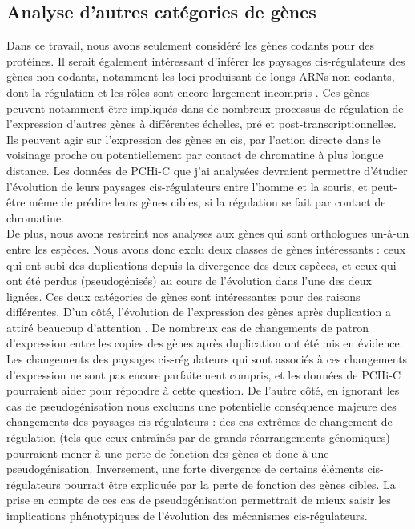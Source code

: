 \subsection{Analyse d’autres catégories de gènes}
Dans ce travail, nous avons seulement considéré les gènes codants pour des protéines. Il serait également intéressant d’inférer les paysages \gls{cis}-régulateurs des gènes non-codants, notamment les loci produisant de longs ARNs non-codants, dont la régulation et les rôles sont encore largement incompris \citep{mercer_long_2009, ransohoff_functions_2018}. Ces gènes peuvent notamment être impliqués dans de nombreux processus de régulation de l’expression d’autres gènes à différentes échelles, pré et post-transcriptionnelles. Ils peuvent agir sur l’expression des gènes en \gls{cis}, par l’action directe dans le voisinage proche ou potentiellement par contact de chromatine à plus longue distance. Les données de \acrshort{PCHi-C} que j’ai analysées devraient permettre d’étudier l'évolution de leurs paysages \gls{cis}-régulateurs entre l’homme et la souris, et peut-être même de prédire leurs gènes cibles, si la régulation se fait par contact de chromatine.\\

De plus, nous avons restreint nos analyses aux gènes qui sont orthologues un-à-un entre les espèces. Nous avons donc exclu deux classes de gènes intéressants : ceux qui ont subi des duplications depuis la divergence des deux espèces, et ceux qui ont été perdus (pseudogénisés) au cours de l’évolution dans l’une des deux lignées. Ces deux catégories de gènes sont intéressantes pour des raisons différentes. D’un côté, l’évolution de l’expression des gènes après duplication a attiré beaucoup d’attention \citep{brunet_gene_2006, guschanski_evolution_2017, carelli_repurposing_2018}. De nombreux cas de changements de patron d’expression entre les copies des gènes après duplication ont été mis en évidence. Les changements des paysages \gls{cis}-régulateurs qui sont associés à ces changements d’expression ne sont pas encore parfaitement compris, et les données de \acrshort{PCHi-C} pourraient aider pour répondre à cette question. De l’autre côté, en ignorant les cas de pseudogénisation nous excluons une potentielle conséquence majeure des changements des paysages \gls{cis}-régulateurs : des cas extrêmes de changement de régulation (tels que ceux entraînés par de grands réarrangements génomiques) pourraient mener à une perte de fonction des gènes et donc à une pseudogénisation. Inversement, une forte divergence de certains éléments \gls{cis}-régulateurs pourrait être expliquée par la perte de fonction des gènes cibles. La prise en compte de ces cas de pseudogénisation permettrait de mieux saisir les implications phénotypiques de l’évolution des mécanismes \gls{cis}-régulateurs.

